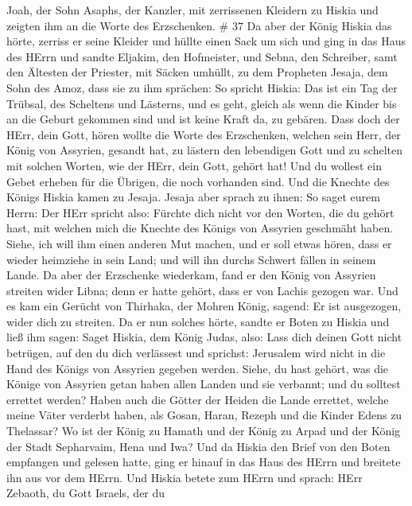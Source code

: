Joah, der Sohn Asaphs, der Kanzler, mit zerrissenen Kleidern zu Hiskia
und zeigten ihm an die Worte des Erzschenken. \# 37  Da aber
der König Hiskia das hörte, zerriss er seine Kleider und hüllte einen
Sack um sich und ging in das Haus des HErrn  und sandte
Eljakim, den Hofmeister, und Sebna, den Schreiber, samt den Ältesten der
Priester, mit Säcken umhüllt, zu dem Propheten Jesaja, dem Sohn des
Amoz,  dass sie zu ihm sprächen: So spricht Hiskia: Das ist
ein Tag der Trübsal, des Scheltens und Lästerns, und es geht, gleich als
wenn die Kinder bis an die Geburt gekommen sind und ist keine Kraft da,
zu gebären.  Dass doch der HErr, dein Gott, hören wollte die
Worte des Erzschenken, welchen sein Herr, der König von Assyrien,
gesandt hat, zu lästern den lebendigen Gott und zu schelten mit solchen
Worten, wie der HErr, dein Gott, gehört hat! Und du wollest ein Gebet
erheben für die Übrigen, die noch vorhanden sind.  Und die
Knechte des Königs Hiskia kamen zu Jesaja.  Jesaja aber
sprach zu ihnen: So saget eurem Herrn: Der HErr spricht also: Fürchte
dich nicht vor den Worten, die du gehört hast, mit welchen mich die
Knechte des Königs von Assyrien geschmäht haben.  Siehe, ich
will ihm einen anderen Mut machen, und er soll etwas hören, dass er
wieder heimziehe in sein Land; und will ihn durchs Schwert fällen in
seinem Lande.  Da aber der Erzschenke wiederkam, fand er den
König von Assyrien streiten wider Libna; denn er hatte gehört, dass er
von Lachis gezogen war.  Und es kam ein Gerücht von
Thirhaka, der Mohren König, sagend: Er ist ausgezogen, wider dich zu
streiten.  Da er nun solches hörte, sandte er Boten zu
Hiskia und ließ ihm sagen: Saget Hiskia, dem König Judas, also: Lass
dich deinen Gott nicht betrügen, auf den du dich verlässest und
sprichst: Jerusalem wird nicht in die Hand des Königs von Assyrien
gegeben werden.  Siehe, du hast gehört, was die Könige von
Assyrien getan haben allen Landen und sie verbannt; und du solltest
errettet werden?  Haben auch die Götter der Heiden die
Lande errettet, welche meine Väter verderbt haben, als Gosan, Haran,
Rezeph und die Kinder Edens zu Thelassar?  Wo ist der König
zu Hamath und der König zu Arpad und der König der Stadt Sepharvaim,
Hena und Iwa?  Und da Hiskia den Brief von den Boten
empfangen und gelesen hatte, ging er hinauf in das Haus des HErrn und
breitete ihn aus vor dem HErrn.  Und Hiskia betete zum
HErrn und sprach:  HErr Zebaoth, du Gott Israels, der du
